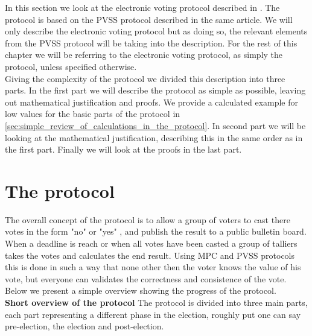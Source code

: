In this section we look at the electronic voting protocol described in \cite{Schoenmakers1999}. The protocol is based on the PVSS protocol described in the same article. We will only describe the electronic voting protocol but as doing so, the relevant elements from the PVSS protocol will be taking into the description. For the rest of this chapter we will be referring to the electronic voting protocol, as simply the protocol, unless specified otherwise. \\

\noindent
Giving the complexity of the protocol we divided this description into three parts. In the first part we will describe the protocol as simple as possible, leaving out mathematical justification and proofs.  We provide a calculated example for low values for the basic parts of the protocol in \ref{sec:simple_review_of_calculations_in_the_protocol}.  In second part we will be looking at the mathematical justification, describing this in the same order as in the first part. Finally we will look at the proofs in the last part. 


\section{The protocol}   \label{sec:the_protocol}


\noindent
The overall concept of the protocol is to allow a group of voters to cast there votes in the form "no" or "yes" , and publish the result to a public bulletin board. When a deadline is reach or when all votes have been casted a group of talliers takes the votes and calculates the end result. 
Using MPC and PVSS protocols this is done in such a way that none other then the voter knows the value of his vote, but everyone can validates the correctness and consistence of the vote. Below we present a simple overview showing the progress of the protocol. \\

\noindent
\textbf{Short overview of the protocol}
The protocol is divided into three main parts, each part representing a different phase in the election, roughly put one can say pre-election, the election and post-election. 

